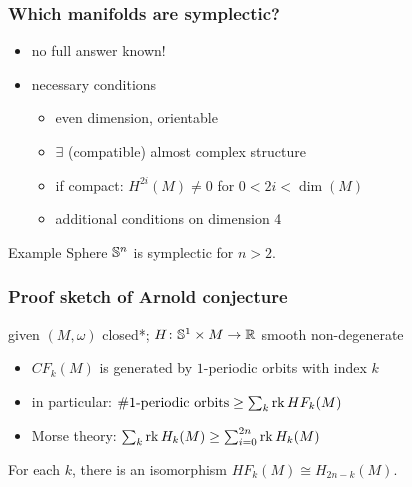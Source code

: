 \begin{frame}
  \frametitle{Which manifolds are symplectic?}
  \begin{itemize}
    \item no full answer known! %
    \item necessary conditions
    \begin{itemize}
      \item even dimension, orientable %
      \item $\exists$ (compatible) almost complex structure
      \item if compact: $H^{2i}(M)\neq 0$ for $0 < 2i < \dim(M)$
      \item additional conditions on dimension 4 %
    \end{itemize}
  \end{itemize}
  \begin{block}{Example}
    Sphere $\mathbb{S}^{n}$ is  symplectic for $n>2$. %
  \end{block}
\end{frame}

\begin{frame}
  \frametitle{Proof sketch of Arnold conjecture}
  given $(M,\omega)$ closed*; $H\colon \mathbb{S}^{1}\times M\to \mathbb{R}$ smooth non-degenerate
  \begin{itemize}
    \item $CF_k(M)$ is generated by $1$-periodic orbits with index $k$
    \item in particular: $\# 1\text{-periodic orbits} \geq \sum_k \operatorname{rk} HF_k(M)$
    \item Morse theory: $\sum_k \operatorname{rk} H_k(M)\geq \sum_{i=0}^{2n} \operatorname{rk} H_k(M)$
  \end{itemize}
  \begin{theorem}
    For each $k$, there is an isomorphism $HF_k(M)\cong H_{2n-k}(M)$.
  \end{theorem}
\end{frame}
